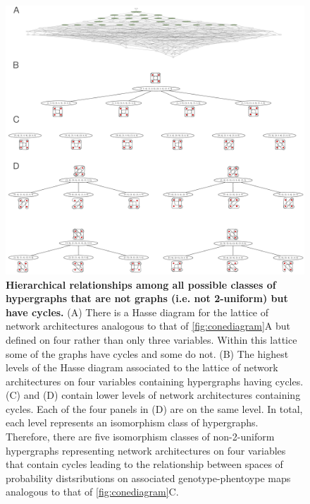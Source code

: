 \begin{figure}[!ht]
\centering
\noindent\includegraphics[width=1.0\columnwidth]{fig/non2uniformcyclichypergraphhasse.pdf}
\caption{{\bf Hierarchical relationships among all possible classes of hypergraphs that are not graphs (i.e. not 2-uniform) but have cycles.} (A) There is a Hasse diagram for the lattice of network architectures analogous to that of \autoref{fig:conediagram}A but defined on four rather than only three variables. Within this lattice some of the graphs have cycles and some do not. (B) The highest levels of the Hasse diagram associated to the lattice of network architectures on four variables containing hypergraphs having cycles. (C) and (D) contain lower levels of network architectures containing cycles. Each of the four panels in (D) are on the same level. In total, each level represents an isomorphism class of hypergraphs. Therefore, there are five isomorphism classes of non-2-uniform hypergraphs representing network architectures on four variables that contain cycles leading to the relationship between spaces of probability distsributions on associated genotype-phentoype maps analogous to that of \autoref{fig:conediagram}C.}
\label{fig:non2uniformcyclichypergraphhasse}
\end{figure}




